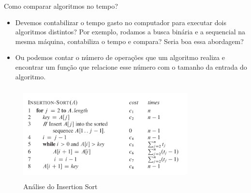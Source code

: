 \begin{frame}
\begin{block}{Como comparar algoritmos no tempo?}
	\begin{itemize}
		\item Devemos contabilizar o tempo gasto no computador para executar dois algoritmos distintos? Por exemplo, rodamos a busca binária e a sequencial na mesma máquina, contabiliza o tempo e compara? Seria boa essa abordagem?

		\item Ou podemos contar o número de operações que um algoritmo realiza e encontrar um função que relacione esse número com o tamanho da entrada do algoritmo.
		
	\end{itemize}
\end{block}
\end{frame}

\begin{frame}	
	\begin{block}{}	
		 \begin{figure}[!htb]
			\centering	  				
			\includegraphics[height=5cm, width = 9cm]{./pic/insertionSort.png}
			\caption{Análise do Insertion Sort}
			\label{fig_analise_insertion}
		\end{figure}
	\end{block}
\end{frame}


